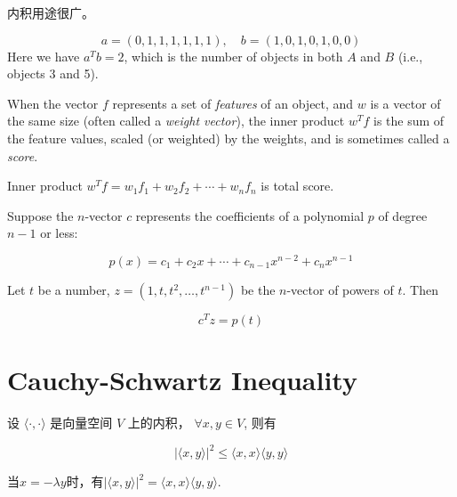 内积用途很广。

\begin{example}[计算同时出现的项目数]
   \begin{equation}
a=(0,1,1,1,1,1,1), \quad b=(1,0,1,0,1,0,0)
\end{equation}
Here we have $ a^{T} b=2 $, which is the number of objects in both $ A $ and $ B $ (i.e., objects 3 and 5). 
\end{example}

\begin{example}
    When the vector $f$ represents a set of \textit{features} of
    an object, and $w$ is a vector of the same size (often called a \textit{weight vector}), the
    inner product $w^T f$ is the sum of the feature values, scaled (or weighted) by
    the weights, and is sometimes called a \textit{score}.

    Inner product $ w^{T} f=w_{1} f_{1}+w_{2} f_{2}+\cdots+w_{n} f_{n} $ is total score. 

\end{example}

\begin{example}[多项式]
    Suppose the $ n $-vector $ c $ represents the coefficients of a polynomial $ p $ of degree $ n-1 $ or less:

    \begin{equation} p(x)=c_{1}+c_{2} x+\cdots+c_{n-1} x^{n-2}+c_{n} x^{n-1} \end{equation}

    Let $t$ be a number, $ z=\left(1, t, t^{2}, \ldots, t^{n-1}\right) $  be the $n$-vector of powers
    of $t$. Then

    \begin{equation} c^{T} z=p(t) \end{equation}
\end{example}


\section{Cauchy-Schwartz Inequality}
\begin{theorem}
    \label{thm:cauchy-schwartz=inequality}
    设 $  \langle \cdot,\cdot \rangle  $ 是向量空间 $  V  $ 上的内积， $  \forall x, y \in V  $, 则有

    \begin{equation}
|\langle x, y\rangle|^{2} \leq\langle x, x\rangle\langle y, y\rangle
\end{equation}

    当$x=-\lambda y$时，有$|\langle x, y\rangle|^{2}=\langle x, x\rangle\langle y, y\rangle$.
\end{theorem}

